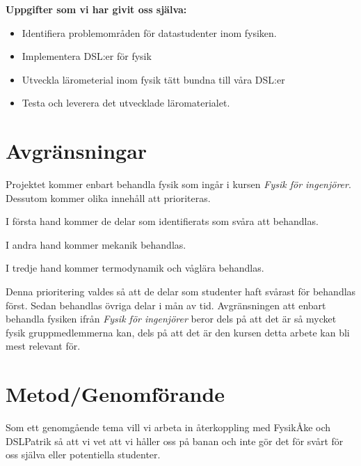 \documentclass[12pt,a4paper]{scrartcl}
\begin{document}
\textbf{Uppgifter som vi har givit oss själva:}

\begin{itemize}
    \item Identifiera problemområden för datastudenter inom fysiken.
    \item Implementera DSL:er för fysik
    \item Utveckla lärometerial inom fysik tätt bundna till våra DSL:er
    \item Testa och leverera det utvecklade läromaterialet.
\end{itemize}

\section{Avgränsningar}

Projektet kommer enbart behandla fysik som ingår i kursen \textit{Fysik för ingenjörer}. Dessutom kommer olika innehåll att prioriteras.

I första hand kommer de delar som identifierats som svåra att behandlas.

I andra hand kommer mekanik behandlas.

I tredje hand kommer termodynamik och våglära behandlas.

Denna prioritering valdes så att de delar som studenter haft svårast för behandlas först. Sedan behandlas övriga delar i mån av tid. Avgränsningen att enbart behandla fysiken ifrån \textit{Fysik för ingenjörer} beror dels på att det är så mycket fysik gruppmedlemmerna kan, dels på att det är den kursen detta arbete kan bli mest relevant för.





\section{Metod/Genomförande}

Som ett genomgående tema vill vi arbeta in återkoppling med FysikÅke och DSLPatrik så att vi vet att vi håller oss på banan och inte gör det för svårt för oss själva eller potentiella studenter.
\end{document}

